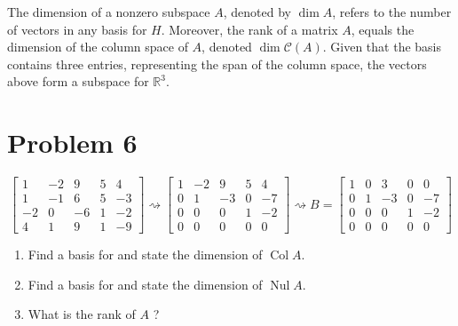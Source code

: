\documentclass[letter,11pt]{article}
\theoremstyle{definition}
\begin{document}
\begin{tcolorbox}[boxrule=1mm, width=(\linewidth),before=\hfill,after=\hfill,adjusted title={Problem 5 Solutions}]
The dimension of a nonzero subspace $A$, denoted by $\operatorname{dim} A$, refers to the number of vectors in any basis for $H$. Moreover, the rank of a matrix $A$,  equals the dimension of the column space of $A$, denoted $\operatorname{dim} \mathcal{C}(A)$. Given that the basis contains three entries, representing the span of the column space, the vectors above form a subspace for $\mathbb{R}^3$.
\end{tcolorbox}

\newpage
\section{Problem 6}
$$\begin{bmatrix}
1 & -2 & 9 & 5 & 4 \\
1 & -1 & 6 & 5 & -3 \\
-2 & 0 & -6 & 1 & -2 \\
4 & 1 & 9 & 1 & -9
\end{bmatrix} \rightsquigarrow
\begin{bmatrix}
1 & -2 & 9 & 5 & 4 \\
0 & 1 & -3 & 0 & -7 \\
0 & 0 & 0 & 1 & -2 \\
0 & 0 & 0 & 0 & 0
\end{bmatrix} \rightsquigarrow
B=\begin{bmatrix}
1 & 0 & 3 & 0 & 0 \\
0 & 1 & -3 & 0 & -7 \\
0 & 0 & 0 & 1 & -2 \\
0 & 0 & 0 & 0 & 0
\end{bmatrix}$$

\begin{enumerate}[label = \roman*.]
    \item Find a basis for and state the dimension of $\operatorname{Col} A$.
    \item Find a basis for and state the dimension of $\operatorname{Nul} A$.
    \item What is the rank of $A$ ?
\end{enumerate}
\end{document}
